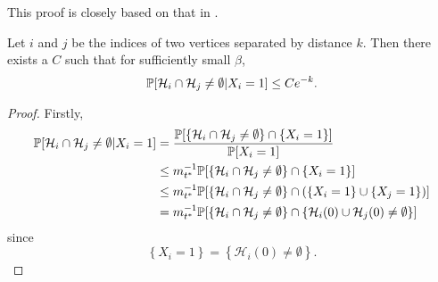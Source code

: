 	This proof is closely based on that in \cite{Lubetzky2014-po}.
	\begin{lemma}
		\label{lem: prob intersect given X_i = 1}
		Let $i$ and $j$ be the indices of two vertices separated by distance $k$. Then there exists a $C$ such that for sufficiently small $\beta$,
		\begin{equation}
			\mathbb{P}[\mathcal{H}_i \cap \mathcal{H}_j \neq \emptyset | X_i = 1] \leq Ce^{-k}.
		\end{equation}
	\end{lemma}
	\begin{proof}
		Firstly,
		\begin{align}
			\mathbb{P}[\mathcal{H}_i \cap \mathcal{H}_j \neq \emptyset | X_i = 1] &= \frac{\mathbb{P}[\left\{\mathcal{H}_i \cap \mathcal{H}_j \neq \emptyset\right\} \cap \{X_i = 1\}]}{\mathbb{P}[X_i = 1]}\\
			&\leq m_{t^*}^{-1} \mathbb{P}[\left\{\mathcal{H}_i \cap \mathcal{H}_j \neq \emptyset\right\} \cap \{X_i = 1\}]\\
			&\leq  m_{t^*}^{-1} \mathbb{P}[\left\{\mathcal{H}_i \cap \mathcal{H}_j \neq \emptyset\right\} \cap \left(\{X_i = 1\} \cup \{X_j = 1\}\right)]\\
			&= m_{t^*}^{-1} \mathbb{P}[\left\{\mathcal{H}_i \cap \mathcal{H}_j \neq \emptyset\right\} \cap \left\{\mathcal{H}_i(0) \cup \mathcal{H}_j(0) \neq \emptyset\right\}]
		\end{align}
		since
		\begin{equation}
			\left\{X_i = 1\right\} = \left\{\mathcal{H}_i(0) \neq \emptyset\right\}.
		\end{equation}

\end{proof}
